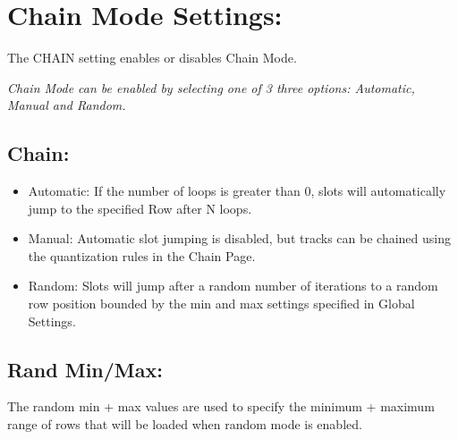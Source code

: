 \chapter{Chain Mode Settings:}
The CHAIN setting enables or disables Chain Mode.


\textit{ Chain Mode can be enabled by selecting one of 3 three options: Automatic, Manual and Random.}
\\
\section{Chain:}
\begin{itemize}
\item Automatic: If the number of loops is greater than 0, slots will automatically jump to the specified Row after N loops.
\item Manual: Automatic slot jumping is disabled, but tracks can be chained using the quantization rules in the Chain Page.
\item Random: Slots will jump after a random number of iterations to a random row position bounded by the min and max settings specified in Global Settings.
\end{itemize}
\section{Rand Min/Max:} The random min + max values are used to specify the minimum + maximum range of rows that will be loaded when random mode is enabled.

